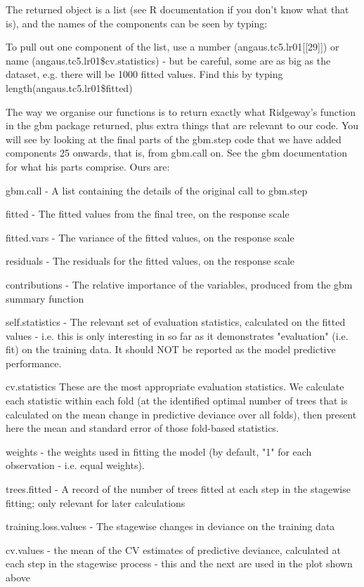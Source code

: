 \documentclass{article}
\begin{document}
The returned object is a list (see R documentation if you don't know what that is), and the names of the components can be seen by typing:

To pull out one component of the list, use a number (angaus.tc5.lr01[[29]]) or name (angaus.tc5.lr01\$cv.statistics) - but be careful, some are as big as the dataset, e.g. there will be 1000 fitted values. Find this by typing 
length(angaus.tc5.lr01\$fitted)

The way we organise our functions is to return exactly what Ridgeway's function in the gbm package returned, plus extra things that are relevant to our code. You will see by looking at the final parts of the gbm.step code that we have added components 25 onwards, that is, from gbm.call on. See the gbm documentation for what his parts comprise. Ours are:

gbm.call - A list containing the details of the original call to gbm.step
 
fitted - The fitted values from the final tree, on the response scale
 
fitted.vars - The variance of the fitted values, on the response scale

residuals - The residuals for the fitted values, on the response scale 

contributions - The relative importance of the variables, produced from the gbm summary function

self.statistics - The relevant set of evaluation statistics, calculated on the fitted values - i.e. this is only interesting in so far as it demonstrates "evaluation" (i.e. fit) on the training data. It should NOT be reported as the model predictive performance.

cv.statistics These are the most appropriate evaluation statistics. We calculate each statistic within each fold (at the identified optimal number of trees that is calculated on the mean change in predictive deviance over all folds), then present here the mean and standard error of those fold-based statistics. 

weights - the weights used in fitting the model (by default, "1" for each observation - i.e. equal weights). 

trees.fitted - A record of the number of trees fitted at each step in the stagewise fitting; only relevant for later calculations

training.loss.values - The stagewise changes in deviance on the training data 

cv.values - the mean of the CV estimates of predictive deviance, calculated at each step in the stagewise process - this and the next are used in the plot shown above
\end{document}
